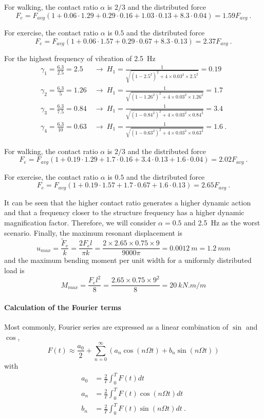 \begin{Answer}[ref={footfall_analysis}]
For walking, the contact ratio $\alpha$ is $2/3$ and the distributed force
$$
F_e = F_{avg} (1 + 0.06\cdot1.29 + 0.29\cdot0.16 + 1.03\cdot0.13 + 8.3\cdot0.04) = 1.59F_{avg}\ .
$$

For exercise, the contact ratio $\alpha$ is $0.5$ and the distributed force
$$
F_e = F_{avg} (1 + 0.06\cdot1.57 + 0.29\cdot0.67 + 8.3\cdot0.13) = 2.37F_{avg}\ .
$$

For the highest frequency of vibration of \qty{2.5}{Hz}
\begin{align*}
\gamma_1 = \frac{6.3}{2.5} = 2.5\ &\rightarrow\ H_1 = \frac{1}{\sqrt{(1-2.5^2)^2 + 4\times0.03^2\times2.5^2}} = 0.19\\
\gamma_2 = \frac{6.3}{5} = 1.26\ &\rightarrow\ H_1 = \frac{1}{\sqrt{(1-1.26^2)^2 + 4\times0.03^2\times1.26^2}} = 1.7\\
\gamma_3 = \frac{6.3}{7.5} = 0.84\ &\rightarrow\ H_1 = \frac{1}{\sqrt{(1-0.84^2)^2 + 4\times0.03^2\times0.84^2}} = 3.4\\
\gamma_4 = \frac{6.3}{10} = 0.63\ &\rightarrow\ H_1 = \frac{1}{\sqrt{(1-0.63^2)^2 + 4\times0.03^2\times0.63^2}} = 1.6\ .
\end{align*}

For walking, the contact ratio $\alpha$ is $2/3$ and the distributed force
$$
F_e = F_{avg} (1 + 0.19\cdot1.29 + 1.7\cdot0.16 + 3.4\cdot0.13 + 1.6\cdot0.04) = 2.02F_{avg}\ .
$$

For exercise, the contact ratio $\alpha$ is $0.5$ and the distributed force
$$
F_e = F_{avg} (1 + 0.19\cdot1.57 + 1.7\cdot0.67 + 1.6\cdot0.13) = 2.65F_{avg}\ .
$$

It can be seen that the higher contact ratio generates a higher dynamic action and that a frequency closer to the structure frequency has a higher dynamic magnification factor. Therefore, we will consider $\alpha=0.5$ and \qty{2.5}{Hz} as the worst scenario.
Finally, the maximum resonant displacement is
$$
u_{max} = \frac{\tilde{F}_e}{k} = \frac{2F_el}{\pi k} = \frac{2\times2.65\times0.75\times9}{9000\pi} = \SI{0.0012}{m} = \SI{1.2}{mm}
$$
and the maximum bending moment per unit width for a uniformly distributed load is
$$
M_{max} = \frac{F_el^2}{8} = \frac{2.65\times0.75\times9^2}{8} = \SI{20}{kN.m/m}
$$


\paragraph{Calculation of the Fourier terms}
Most commonly, Fourier series are expressed as a linear combination of $\sin$ and $\cos$,
$$
F(t) \approx \frac{a_0}{2} + \sum_{n=0}^{\infty} \left(a_n\cos(n\Omega t) + b_n\sin(n\Omega t)\right)
$$
with
\begin{align*}
a_0 &= \frac{2}{T}\int_{0}^{T} F(t) dt \\
a_n &= \frac{2}{T}\int_{0}^{T} F(t) \cos(n\Omega t) dt \\
b_n &= \frac{2}{T}\int_{0}^{T} F(t) \sin(n\Omega t) dt \ .
\end{align*}


\end{Answer}
